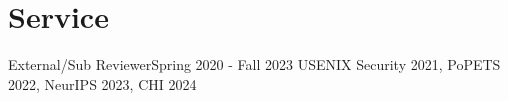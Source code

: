 \section{Service}
\CVSubHeadingListStart
    \CVSubheading
      {External/Sub Reviewer}{Spring 2020 - Fall 2023}
      {USENIX Security 2021, PoPETS 2022, NeurIPS 2023, CHI 2024}{}
  \CVSubHeadingListEnd
